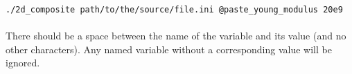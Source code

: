 \documentclass[10pt]{article}
\newcommand{\amie}{\textsc{amie}\xspace}
\begin{document}
\verb+./2d_composite path/to/the/source/file.ini @paste_young_modulus 20e9+

\paragraph{} There should be a space between the name of the variable and its value (and no other characters). Any named variable without a corresponding value will be ignored.






\end{document}
